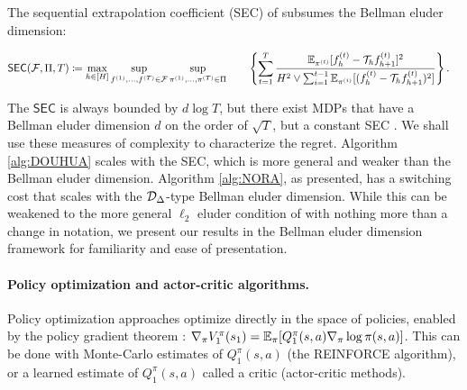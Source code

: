 The sequential extrapolation coefficient (SEC) of \citet{xie2022role} subsumes the Bellman eluder dimension:
\begin{defn}\label{defn:SEC}
    \begin{align}
        &\mathsf{SEC}({\mathcal{F}},\Pi,T) \coloneqq \max_{h \in [H]} \sup_{f^{(1)}, \ldots, f^{(T)} \in {\mathcal{F}}} \sup_{\pi^{(1)}, \dots, \pi^{(T)} \in \Pi} \qquad\left\{\sum_{t=1}^T \frac{\mathbb{E}_{\pi^{(t)}}[f_h^{(t)} - {\mathcal{T}}_h f_{h+1}^{(t)}]^2}{H^2 \vee \sum_{i=1}^{t-1} \mathbb{E}_{\pi^{(i)}}[(f_h^{(t)} - {\mathcal{T}}_h f_{h+1}^{(t)})^2]}\right\}.
    \end{align}
\end{defn}

The $\mathsf{SEC}$ is always bounded by $d \log T$, but there exist MDPs that have a Bellman eluder dimension $d$ on the order of $\sqrt{T}$, but a constant SEC \citep{xie2022role}. 
We shall use these measures of complexity to characterize the regret. 
Algorithm \ref{alg:DOUHUA} scales with the SEC, which is more general and weaker than the Bellman eluder dimension. Algorithm \ref{alg:NORA}, as presented, has a switching cost that scales with the ${\mathcal{D}}_\Delta$-type Bellman eluder dimension. While this can be weakened to the more general $\ell_2$ eluder condition of \cite{xiong2023generalframeworksequentialdecisionmaking} with nothing more than a change in notation, we present our results in the Bellman eluder dimension framework for familiarity and ease of presentation.



\paragraph{Policy optimization and actor-critic algorithms.}
Policy optimization approaches optimize directly in the space of policies, enabled by the policy gradient theorem \citep{sutton1998}: $\nabla_\pi V_1^\pi(s_1) = \mathbb{E}_\pi[Q_1^\pi(s,a)\nabla_\pi \log \pi(s,a)]$. This can be done with Monte-Carlo estimates of $Q_1^\pi(s,a)$ (the REINFORCE algorithm), or a learned estimate of $Q_1^\pi(s,a)$ called a critic (actor-critic methods).

